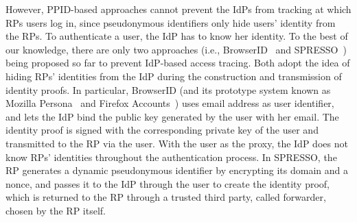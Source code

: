 

However, PPID-based approaches cannot prevent the IdPs from tracking at which RPs users log in, since pseudonymous identifiers only hide users' identity from the RPs. To authenticate a user, the IdP has to know her identity. To the best of our knowledge, there are only two approaches (i.e., BrowserID~\cite{BrowserID} and SPRESSO~\cite{SPRESSO}) being proposed so far to prevent IdP-based access tracing. Both adopt the idea of hiding RPs' identities from the IdP during the construction and transmission of identity proofs. In particular, BrowserID (and its prototype system known as Mozilla Persona~\cite{persona} and Firefox Accounts~\cite{FirefoxAccount}) uses email address as user identifier, and lets the IdP bind the public key generated by the user with her email. The identity proof is signed with the corresponding private key of the user and transmitted to the RP via the user. With the user as the proxy, the IdP does not know RPs' identities throughout the authentication process. In SPRESSO, the RP generates a dynamic pseudonymous identifier by encrypting its domain and a nonce, and passes it to the IdP through the user to create the identity proof, which is returned to the RP through a trusted third party, called forwarder, chosen by the RP itself.


